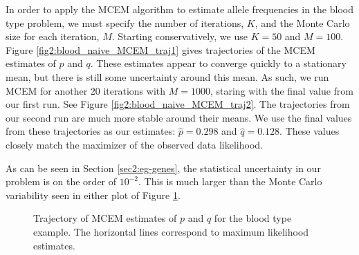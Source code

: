 \documentclass[11pt, oneside]{article}   	%
\begin{document}
In order to apply the MCEM algorithm to estimate allele frequencies in the blood type problem, we must specify the number of iterations, $K$, and the Monte Carlo size for each iteration, $M$. Starting conservatively, we use $K=50$ and $M=100$. Figure \ref{fig2:blood_naive_MCEM_traj1} gives trajectories of the MCEM estimates of $p$ and $q$. These estimates appear to converge quickly to a stationary mean, but there is still some uncertainty around this mean. As such, we run MCEM for another 20 iterations with $M=1000$, staring with the final value from our first run. See Figure \ref{fig2:blood_naive_MCEM_traj2}. The trajectories from our second run are much more stable around their means. We use the final values from these trajectories as our estimates: $\hat{p} = 0.298$ and $\hat{q} = 0.128$. These values closely match the maximizer of the observed data likelihood. 

As can be seen in Section \ref{sec2:eg-genes}, the statistical uncertainty in our problem is on the order of $10^{-2}$. This is much larger than the Monte Carlo variability seen in either plot of Figure \ref{fig2:blood_naive_MCEM_traj}.

   



\begin{figure}
    \centering
    \caption{Trajectory of MCEM estimates of $p$ and $q$ for the blood type example. The horizontal lines correspond to maximum likelihood estimates.}
    \label{fig2:blood_naive_MCEM_traj}
    
\end{figure}
\end{document}

